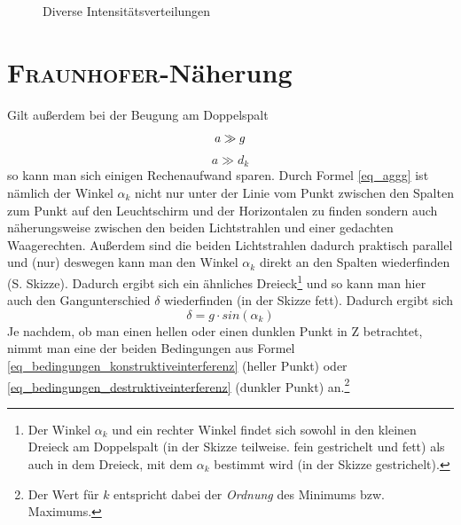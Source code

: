 \begin{figure}
   
  
   \caption{Diverse Intensitätsverteilungen}
     
\end{figure}



		\section{\textsc{Fraunhofer}-Näherung} 
Gilt außerdem bei der Beugung am Doppelspalt
\begin{equation}
a \gg g\\
 	\label{eq_aggg}
 \end{equation}
 \begin{equation}
a \gg d_k
 	\label{eq_aggdk}
\end{equation}
so kann man sich einigen Rechenaufwand sparen. Durch Formel \ref{eq_aggg} ist nämlich der Winkel \(\alpha_k\) nicht nur unter der Linie vom Punkt zwischen den Spalten zum Punkt auf den Leuchtschirm und der Horizontalen zu finden sondern auch näherungsweise zwischen den beiden Lichtstrahlen und einer gedachten Waagerechten. Außerdem sind die beiden Lichtstrahlen dadurch praktisch parallel und (nur) deswegen kann man den Winkel \(\alpha_k\) direkt an den Spalten wiederfinden (S. Skizze). Dadurch ergibt sich ein ähnliches Dreieck\footnote{Der Winkel \(\alpha_k\) und ein rechter Winkel findet sich sowohl in den kleinen Dreieck am Doppelspalt (in der Skizze teilweise. fein gestrichelt und fett) als auch in dem Dreieck, mit dem \(\alpha_k\) bestimmt wird (in der Skizze gestrichelt).} und so kann man hier auch den Gangunterschied \(\delta\) wiederfinden (in der Skizze fett). Dadurch ergibt sich
\begin{equation}
 	\delta = g \cdot sin(\alpha_k)
 		\label{eq_gangunterschied_doppelspalt}
\end{equation}
Je nachdem, ob man einen hellen oder einen dunklen Punkt in Z betrachtet, nimmt man eine der beiden Bedingungen aus Formel \ref{eq_bedingungen_konstruktiveinterferenz} (heller Punkt) oder \ref{eq_bedingungen_destruktiveinterferenz} (dunkler Punkt) an.\footnote{Der Wert für \(k\) entspricht dabei der \emph{Ordnung} des Minimums bzw. Maximums.} 

